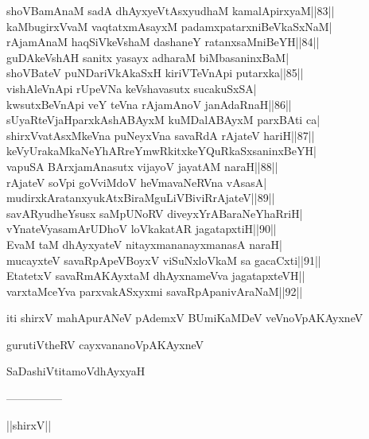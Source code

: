 \documentclass{article}
\begin{document}
shoVBamAnaM sadA dhAyxyeVtAsxyudhaM kamalApirxyaM||83||\\
kaMbugirxVvaM vaqtatxmAsayxM padamxpatarxniBeVkaSxNaM|\\
rAjamAnaM haqSiVkeVshaM dashaneY ratanxsaMniBeYH||84||\\
guDAkeVshAH sanitx yasayx adharaM biMbasaninxBaM|\\
shoVBateV puNDariVkAkaSxH kiriVTeVnApi putarxka||85||\\
vishAleVnApi rUpeVNa keVshavasutx sucakuSxSA|\\
kwsutxBeVnApi veY teVna rAjamAnoV janAdaRnaH||86||\\
sUyaRteVjaHparxkAshABAyxM kuMDalABAyxM parxBAti ca|\\
shirxVvatAsxMkeVna puNeyxVna savaRdA rAjateV hariH||87||\\
keVyUrakaMkaNeYhARreYmwRkitxkeYQuRkaSxsaninxBeYH|\\
vapuSA BArxjamAnasutx vijayoV jayatAM naraH||88||\\
rAjateV soVpi goVviMdoV heVmavaNeRVna vAsasA|\\
mudirxkAratanxyukAtxBiraMguLiVBiviRrAjateV||89||\\
savARyudheYsusx saMpUNoRV diveyxYrABaraNeYhaRriH|\\
vYnateVyasamArUDhoV loVkakatAR jagatapxtiH||90||\\
EvaM taM dhAyxyateV nitayxmananayxmanasA naraH|\\
mucayxteV savaRpApeVBoyxV viSuNxloVkaM sa gacaCxti||91||\\
EtatetxV savaRmAKAyxtaM dhAyxnameVva jagatapxteVH||\\
varxtaMceYva parxvakASxyxmi savaRpApanivAraNaM||92||

\begin{center}
iti shirxV mahApurANeV pAdemxV BUmiKaMDeV veVnoVpAKAyxneV
\end{center}

\begin{center}
gurutiVtheRV cayxvananoVpAKAyxneV
\end{center}

\begin{center}
SaDashiVtitamoVdhAyxyaH
\end{center}

\begin{center}
---------------
\end{center}

\begin{center}
||shirxV||
\end{center}
\end{document}

